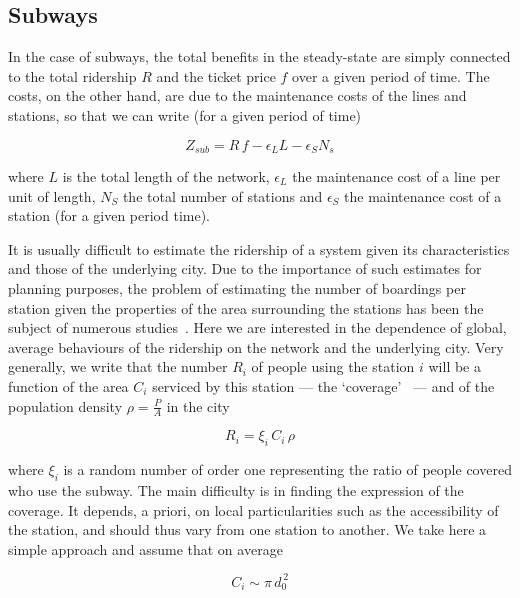 \subsection*{Subways}

In the case of subways, the total benefits in the steady-state are simply connected to the total ridership $R$ and the ticket price $f$ over a given period of time. The costs, on the other hand, are due to the maintenance costs of the lines and stations, so that we can write (for a given period of time)

\begin{equation}
    Z_{sub} = R\,f - \epsilon_L L - \epsilon_S N_s
    \label{eq:cost-benefit}
\end{equation}

where $L$ is the total length of the network, $\epsilon_L$ the maintenance cost of a line per unit of length, $N_S$ the total number of stations and $\epsilon_S$ the maintenance cost of a station (for a given period time).

It is usually difficult to estimate the ridership of a system given its characteristics and those of the underlying city. Due to the importance of such estimates for planning purposes, the problem of estimating the number of boardings per station given the properties of the area surrounding the stations has been the subject of numerous studies~\cite{Matsunaka:2013,Kuby:2004}. Here we are interested in the dependence of global, average behaviours of the ridership on the network and the underlying city. Very generally, we write that the number $R_i$ of people using the station $i$ will be a function of the area $C_i$ serviced by this station --- the `coverage'~\cite{Derrible:2009} --- and of the population density $\rho = \frac{P}{A}$ in the city

\begin{equation}
    R_i = \xi_i\, C_i\, \rho
\end{equation}

where $\xi_i$ is a random number of order one representing the ratio of people covered who use the subway. The main difficulty is in finding the expression of the coverage. It depends, a priori, on local particularities such as the accessibility of the station, and should thus vary from one station to another. We take here a simple approach and assume that on average

\begin{equation}
    C_i \sim \pi\, d_0^{\,2}
\end{equation}

